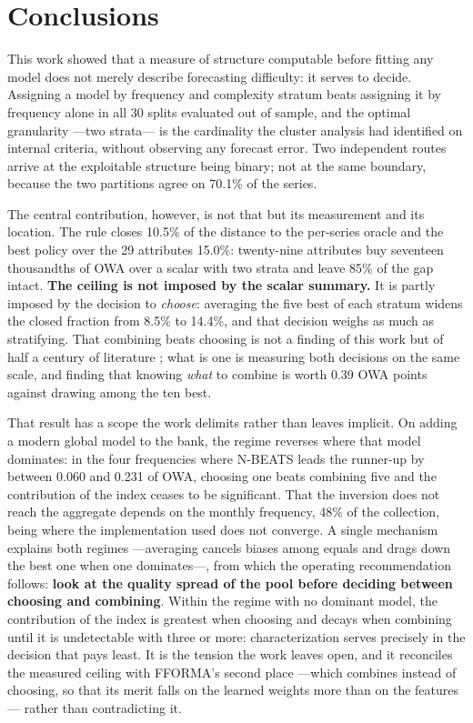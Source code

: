 \section{Conclusions}\label{sec:conclusiones}

This work showed that a measure of structure computable before fitting any model does not
merely describe forecasting difficulty: it serves to decide. Assigning a model by
frequency and complexity stratum beats assigning it by frequency alone in all 30 splits
evaluated out of sample, and the optimal granularity ---two strata--- is the cardinality
the cluster analysis had identified on internal criteria, without observing any forecast
error. Two independent routes arrive at the exploitable structure being binary; not at the
same boundary, because the two partitions agree on 70.1\% of the series.

The central contribution, however, is not that but its measurement and its location. The
rule closes 10.5\% of the distance to the per-series oracle and the best policy over the
29 attributes 15.0\%: twenty-nine attributes buy seventeen thousandths of OWA over a
scalar with two strata and leave 85\% of the gap intact. \textbf{The ceiling is not
imposed by the scalar summary.} It is partly imposed by the decision to \emph{choose}:
averaging the five best of each stratum widens the closed fraction from 8.5\% to 14.4\%,
and that decision weighs as much as stratifying. That combining beats choosing is not a
finding of this work but of half a century of literature \cite{bates1969,wang2023}; what
is one is measuring both decisions on the same scale, and finding that knowing \emph{what}
to combine is worth 0.39 OWA points against drawing among the ten best.

That result has a scope the work delimits rather than leaves implicit. On adding a modern
global model to the bank, the regime reverses where that model dominates: in the four
frequencies where N-BEATS leads the runner-up by between 0.060 and 0.231 of OWA, choosing
one beats combining five and the contribution of the index ceases to be significant. That
the inversion does not reach the aggregate depends on the monthly frequency, 48\% of the
collection, being where the implementation used does not converge. A single mechanism
explains both regimes ---averaging cancels biases among equals and drags down the best one
when one dominates---, from which the operating recommendation follows: \textbf{look at
the quality spread of the pool before deciding between choosing and combining}. Within the
regime with no dominant model, the contribution of the index is greatest when choosing and
decays when combining until it is undetectable with three or more: characterization serves
precisely in the decision that pays least. It is the tension the work leaves open, and it
reconciles the measured ceiling with FFORMA's second place ---which combines instead of
choosing, so that its merit falls on the learned weights more than on the features---
rather than contradicting it.


